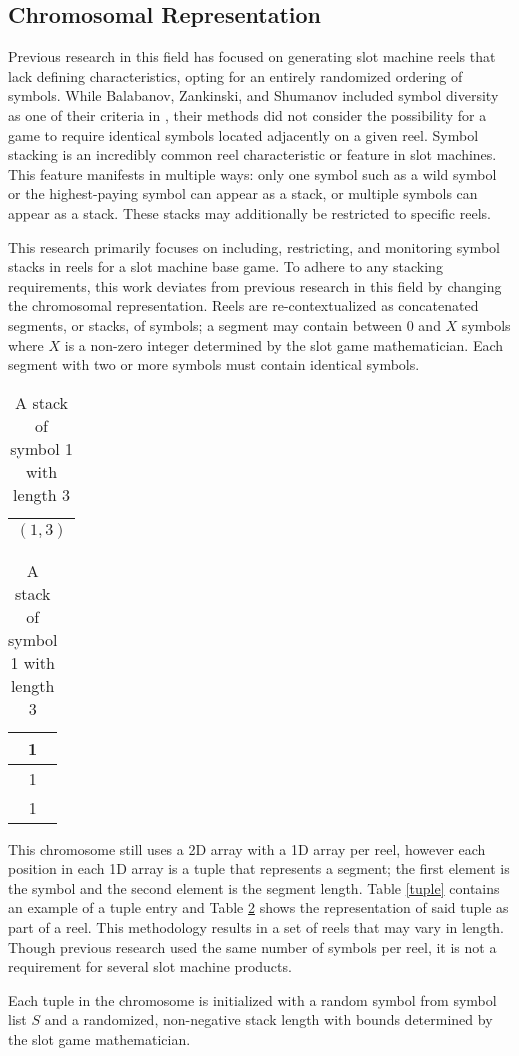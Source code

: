 \documentclass[conference]{IEEEtran}
\begin{document}
\subsection{Chromosomal Representation}
Previous research in this field has focused on generating slot machine reels that lack defining characteristics, opting for an entirely randomized ordering of symbols.
While Balabanov, Zankinski, and Shumanov included symbol diversity as one of their criteria in \cite{balabanovDDE}, their methods did not consider the possibility for a game to require identical symbols located adjacently on a given reel.
Symbol stacking is an incredibly common reel characteristic or feature in slot machines.
This feature manifests in multiple ways: only one symbol such as a wild symbol or the highest-paying symbol can appear as a stack, or multiple symbols can appear as a stack.
These stacks may additionally be restricted to specific reels.
\par
This research primarily focuses on including, restricting, and monitoring symbol stacks in reels for a slot machine base game.
To adhere to any stacking requirements, this work deviates from previous research in this field by changing the chromosomal representation.
Reels are re-contextualized as concatenated segments, or stacks, of symbols; a segment may contain between 0 and $X$ symbols where $X$ is a non-zero integer determined by the slot game mathematician.
Each segment with two or more symbols must contain identical symbols.
\begin{table}
\parbox{.45\linewidth}{
\centering
\begin{tabular}{|c|}
\hline
$(1,3)$\\
\hline
\end{tabular}
\caption{A tuple depicting a stack of symbol 1 with length 3}
\label{tuple}
}
\hfill
\parbox{.45\linewidth}{
\centering
\begin{tabular}{|c|}
\hline
1\\
\hline
1\\
\hline
1\\
\hline
\end{tabular}
\caption{A stack of symbol 1 with length 3}
\label{stack}
}
\end{table}
\par
This chromosome still uses a 2D array with a 1D array per reel, however each position in each 1D array is a tuple that represents a segment; the first element is the symbol and the second element is the segment length. Table \ref{tuple} contains an example of a tuple entry and Table \ref{stack} shows the representation of said tuple as part of a reel.
This methodology results in a set of reels that may vary in length.
Though previous research used the same number of symbols per reel, it is not a requirement for several slot machine products.
\par
Each tuple in the chromosome is initialized with a random symbol from symbol list $S$ and a randomized, non-negative stack length with bounds determined by the slot game mathematician.
\end{document}
